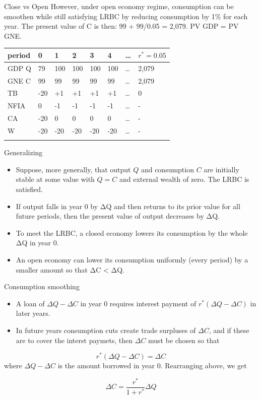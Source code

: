 \documentclass[
  ignorenonframetext,
]{beamer}
\providecommand{\tightlist}{%
  \setlength{\itemsep}{0pt}\setlength{\parskip}{0pt}}\usepackage{longtable,booktabs,array}
\begin{document}
\begin{frame}{Close vs Open}
\label{close-vs-open-3}
However, under open economy regime, consumption can be smoothen while
still satisfying LRBC by reducing consumption by 1\% for each year. The
present value of C is then: 99 + 99/0.05 = 2,079. PV GDP = PV GNE.

\begin{longtable}[]{@{}llllllll@{}}
\toprule\noalign{}
period & 0 & 1 & 2 & 3 & 4 & \ldots{} & \(r^*=0.05\) \\
\midrule\noalign{}
\endhead
GDP Q & 79 & 100 & 100 & 100 & 100 & \ldots{} & 2,079 \\
GNE C & 99 & 99 & 99 & 99 & 99 & \ldots{} & 2,079 \\
TB & -20 & +1 & +1 & +1 & +1 & \ldots{} & 0 \\
NFIA & 0 & -1 & -1 & -1 & -1 & \ldots{} & - \\
CA & -20 & 0 & 0 & 0 & 0 & \ldots{} & - \\
W & -20 & -20 & -20 & -20 & -20 & \ldots{} & - \\
\bottomrule\noalign{}
\end{longtable}
\end{frame}

\begin{frame}{Generalizing}
\label{generalizing}
\begin{itemize}
\tightlist
\item
  Suppose, more generally, that output \(Q\) and consumption \(C\) are
  initially stable at some value with \(Q = C\) and external wealth of
  zero. The LRBC is satisfied.
\item
  If output falls in year 0 by ΔQ and then returns to its prior value
  for all future periods, then the present value of output decreases by
  ΔQ.
\item
  To meet the LRBC, a closed economy lowers its consumption by the whole
  ΔQ in year 0.
\item
  An open economy can lower its consumption uniformly (every period) by
  a smaller amount so that ΔC \textless{} ΔQ.
\end{itemize}
\end{frame}

\begin{frame}{Consumption smoothing}
\label{consumption-smoothing-4}
\begin{itemize}
\item
  A loan of \(\Delta Q-\Delta C\) in year 0 requires interest payment of
  \(r^*(\Delta Q -\Delta C)\) in later years.
\item
  In future years consumption cuts create trade surpluses of
  \(\Delta C\), and if these are to cover the interst paymets, then
  \(\Delta C\) must be chosen so that
\end{itemize}

\[
r^*(\Delta Q-\Delta C)=\Delta C
\] where \(\Delta Q- \Delta C\) is the amount borrowed in year 0.
Rearranging above, we get

\[
\Delta C=\frac{r^*}{1+r^*} \Delta Q
\]
\end{frame}
\end{document}
